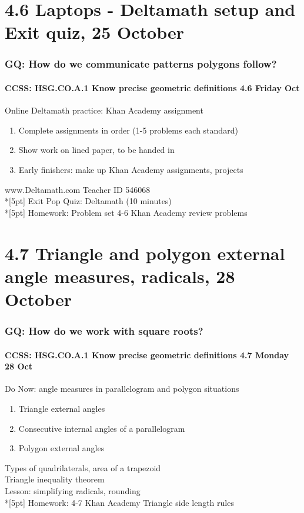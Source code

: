 \documentclass{beamer}
\begin{document}
\section{4.6 Laptops - Deltamath setup and Exit quiz, 25 October}
\frame
{
  \frametitle{GQ: How do we communicate patterns polygons follow?}
  \framesubtitle{CCSS: HSG.CO.A.1 Know precise geometric definitions \hfill \alert{4.6 Friday Oct}}

  \begin{block}{Online Deltamath practice: Khan Academy assignment}
  \begin{enumerate}
    \item Complete assignments in order (1-5 problems each standard)
    \item Show work on lined paper, to be handed in
    \item Early finishers: make up Khan Academy assignments, projects
  \end{enumerate}
  \end{block}
  www.Deltamath.com Teacher ID \alert{546068}\\*[5pt]
  Exit \alert{Pop Quiz}: Deltamath (10 minutes) \\*[5pt]
  Homework: Problem set 4-6 Khan Academy review problems
}

\section{4.7 Triangle and polygon external angle measures, radicals, 28 October}
\frame
{
  \frametitle{GQ: How do we work with square roots?}
  \framesubtitle{CCSS: HSG.CO.A.1 Know precise geometric definitions \hfill \alert{4.7 Monday 28 Oct}}

  \begin{block}{Do Now: angle measures in parallelogram and polygon situations}
  \begin{enumerate}
    \item Triangle external angles
    \item Consecutive internal angles of a parallelogram
    \item Polygon external angles
  \end{enumerate}
  \end{block}
  Types of quadrilaterals, area of a trapezoid \\
  Triangle inequality theorem \\
  Lesson: simplifying radicals, rounding \\*[5pt]
  Homework: 4-7 Khan Academy Triangle side length rules
}
\end{document}
